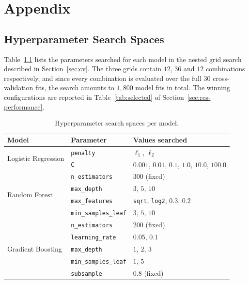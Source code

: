 \chapter{Appendix}
\label{ch:appendix}

\section{Hyperparameter Search Spaces}
\label{sec:app-grids}

Table~\ref{tab:grids} lists the parameters searched for each model in the nested
grid search described in Section~\ref{sec:cv}. The three grids contain $12$, $36$
and $12$ combinations respectively, and since every combination is evaluated over
the full $30$ cross-validation fits, the search amounts to $1{,}800$ model fits in
total. The winning configurations are reported in Table~\ref{tab:selected} of
Section~\ref{sec:res-performance}.

\begin{table}[htbp]
  \centering
  \caption{Hyperparameter search spaces per model.}
  \label{tab:grids}
  \begin{tabular}{lll}
    \toprule
    \textbf{Model} & \textbf{Parameter} & \textbf{Values searched} \\
    \midrule
    \multirow{2}{*}{Logistic Regression}
      & \texttt{penalty}            & $\ell_1$, $\ell_2$ \\
      & \texttt{C}                  & $0.001$, $0.01$, $0.1$, $1.0$, $10.0$, $100.0$ \\
    \midrule
    \multirow{4}{*}{Random Forest}
      & \texttt{n\_estimators}      & $300$ (fixed) \\
      & \texttt{max\_depth}         & $3$, $5$, $10$ \\
      & \texttt{max\_features}      & \texttt{sqrt}, \texttt{log2}, $0.3$, $0.2$ \\
      & \texttt{min\_samples\_leaf} & $3$, $5$, $10$ \\
    \midrule
    \multirow{5}{*}{Gradient Boosting}
      & \texttt{n\_estimators}      & $200$ (fixed) \\
      & \texttt{learning\_rate}     & $0.05$, $0.1$ \\
      & \texttt{max\_depth}         & $1$, $2$, $3$ \\
      & \texttt{min\_samples\_leaf} & $1$, $5$ \\
      & \texttt{subsample}          & $0.8$ (fixed) \\
    \bottomrule
  \end{tabular}
\end{table}

